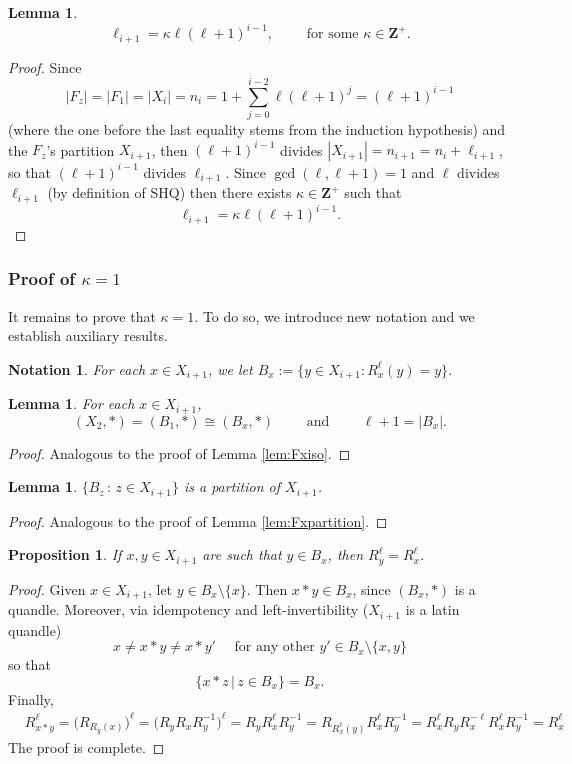 \documentclass{article}
\newtheorem{lemma}[theorem]{Lemma}
\newtheorem{proposition}[theorem]{Proposition}
\newtheorem{notation}[theorem]{Notation}
\begin{document}
\begin{lemma}\label{lem:kappa}
$$\ell_{i+1}=\kappa \ell(\ell+1)^{i-1} ,\qquad \text{ for some $\kappa\in\mathbf{Z}^+$}.$$
\end{lemma}
\begin{proof}
Since $$|F_z|=|F_1|=|X_i|=n_i=1+\sum_{j=0}^{i-2}\ell(\ell+1)^{j}=(\ell +1)^{i-1}$$ (where the one before the last equality stems from the induction hypothesis) and the $F_z$'s partition $X_{i+1}$, then $(\ell +1)^{i-1}$ divides $|X_{i+1}|=n_{i+1}=n_i+\ell_{i+1}$, so that $(\ell +1)^{i-1}$ divides $\ell_{i+1}$. Since $\gcd (\ell, \ell +1) = 1$ and $\ell$ divides $\ell_{i+1}$ (by definition of SHQ) then there exists $\kappa \in \mathbf{Z}^+$ such that $$\ell_{i+1}=\kappa \ell (\ell +1)^{i-1} .$$
\end{proof}
\subsubsection{Proof of $\kappa = 1$}\label{subsubsect:kappa}


It remains to prove that $\kappa=1$. To do so, we introduce new notation and we establish auxiliary results.

\begin{notation}
For each $x\in X_{i+1}$, we let $B_x:=\{y\in X_{i+1}:R_x^\ell(y)=y\}$.
\end{notation}


\begin{lemma}\label{lem:Bxiso}
For each $x\in X_{i+1}$,
$$(X_2, *) = (B_1, *) \cong (B_x, *) \qquad \text{ and } \qquad \ell+1=|B_x| .$$
\end{lemma}
\begin{proof}
Analogous to the proof of Lemma \ref{lem:Fxiso}.
\end{proof}

\begin{lemma}\label{lem:Bxpartition}
$\{ B_z \,:\, z\in X_{i+1} \}$ is a partition of $X_{i+1}$.
\end{lemma}
\begin{proof}
Analogous to the proof of Lemma \ref{lem:Fxpartition}.
\end{proof}





\begin{proposition}\label{prop:asspowers}
If $x,y\in X_{i+1}$ are such that $y\in B_x$, then $R_y^\ell=R_x^\ell$.
\end{proposition}
\begin{proof}Given $x\in X_{i+1}$, let $y\in B_x\setminus \{ x \}$. Then $x*y\in B_x$, since $(B_x, *)$ is a quandle. Moreover, via idempotency and left-invertibility ($X_{i+1}$ is a latin quandle) $$x\neq x*y \neq x*y'\quad \text{ for any other }y'\in B_x\setminus\{ x, y \}$$ so that $$\{ x*z\,|\, z\in B_x  \}=B_x .$$ Finally,
\begin{align*}
&R_{x*y}^{\ell}=\big( R_{R_y(x)} \big)^{\ell}=\big( R_yR_{x}R_y^{-1} \big)^{\ell}=R_yR_{x}^{\ell}R_y^{-1}=R_{R_x^{\ell}(y)}R_{x}^{\ell}R_y^{-1}=R_x^{\ell}R_yR_x^{-\ell}R_{x}^{\ell}R_y^{-1}=R_{x}^{\ell}
\end{align*}
The proof is complete.
\end{proof}
\end{document}
